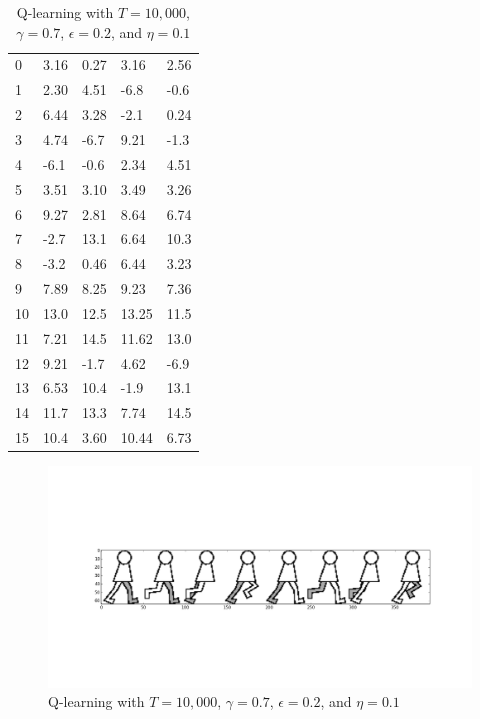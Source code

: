 \documentclass[a4paper]{article}
\begin{document}
\begin{table}[h!]
\centering
\begin{tabular}{l|l|l|l|l}
    0 & 3.16 & 0.27 & 3.16 & 2.56 \\ 
    1 & 2.30 & 4.51 & -6.8 & -0.6 \\ 
    2 & 6.44 & 3.28 & -2.1 & 0.24 \\ 
    3 & 4.74 & -6.7 & 9.21 & -1.3 \\ 
    4 & -6.1 & -0.6 & 2.34 & 4.51 \\ 
    5 & 3.51 & 3.10 & 3.49 & 3.26 \\ 
    6 & 9.27 & 2.81 & 8.64 & 6.74 \\ 
    7 & -2.7 & 13.1 & 6.64 & 10.3 \\ 
    8 & -3.2 & 0.46 & 6.44 & 3.23 \\ 
    9 & 7.89 & 8.25 & 9.23 & 7.36 \\ 
    10 & 13.0 & 12.5 & 13.25 & 11.5 \\ 
    11 & 7.21 & 14.5 & 11.62 & 13.0 \\ 
    12 & 9.21 & -1.7 & 4.62 & -6.9 \\ 
    13 & 6.53 & 10.4 & -1.9 & 13.1 \\ 
    14 & 11.7 & 13.3 & 7.74 & 14.5 \\ 
    15 & 10.4 & 3.60 & 10.44 & 6.73 \\
\end{tabular}
\caption{Q-learning with $T = 10,000$, $\gamma = 0.7$, $\epsilon = 0.2$, and $\eta = 0.1$}
\end{table}
\begin{figure}[h!]
    \centering
    \includegraphics[width=1\textwidth]{qlearning1.png}
    \caption{Q-learning with $T = 10,000$, $\gamma = 0.7$, $\epsilon = 0.2$, and $\eta = 0.1$}
\end{figure}
\end{document}
